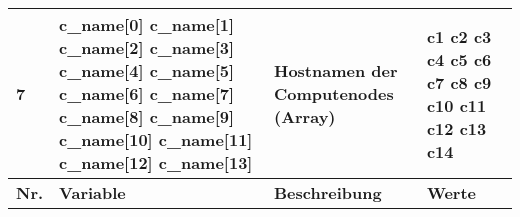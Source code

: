 \begin{longtable}{| p{0.5cm} | p{3cm} | p{8.5cm} | p{4cm} |}
7 &  c\_name[0] \newline  c\_name[1] \newline c\_name[2] \newline c\_name[3] \newline c\_name[4] \newline c\_name[5] \newline c\_name[6] \newline c\_name[7] \newline c\_name[8] \newline c\_name[9] \newline c\_name[10] \newline c\_name[11] \newline c\_name[12] \newline c\_name[13] & Hostnamen der Computenodes (Array) & c1 \newline c2 \newline c3 \newline c4 \newline c5 \newline c6 \newline c7 \newline c8 \newline c9 \newline c10 \newline c11 \newline c12 \newline c13 \newline c14 \\\hline 
\rowcolor{heading} \textbf{Nr.} & \textbf{Variable} & \textbf{Beschreibung} &\textbf{Werte} \\\hline

\end{longtable}
